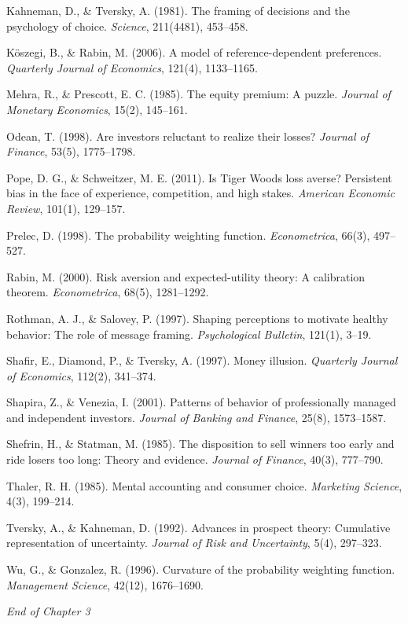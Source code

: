 \documentclass[12pt, letterpaper]{article}
\begin{document}
Kahneman, D., \& Tversky, A. (1981). The framing of decisions and the psychology of choice. \textit{Science}, 211(4481), 453--458.

Köszegi, B., \& Rabin, M. (2006). A model of reference-dependent preferences. \textit{Quarterly Journal of Economics}, 121(4), 1133--1165.

Mehra, R., \& Prescott, E. C. (1985). The equity premium: A puzzle. \textit{Journal of Monetary Economics}, 15(2), 145--161.

Odean, T. (1998). Are investors reluctant to realize their losses? \textit{Journal of Finance}, 53(5), 1775--1798.

Pope, D. G., \& Schweitzer, M. E. (2011). Is Tiger Woods loss averse? Persistent bias in the face of experience, competition, and high stakes. \textit{American Economic Review}, 101(1), 129--157.

Prelec, D. (1998). The probability weighting function. \textit{Econometrica}, 66(3), 497--527.

Rabin, M. (2000). Risk aversion and expected-utility theory: A calibration theorem. \textit{Econometrica}, 68(5), 1281--1292.

Rothman, A. J., \& Salovey, P. (1997). Shaping perceptions to motivate healthy behavior: The role of message framing. \textit{Psychological Bulletin}, 121(1), 3--19.

Shafir, E., Diamond, P., \& Tversky, A. (1997). Money illusion. \textit{Quarterly Journal of Economics}, 112(2), 341--374.

Shapira, Z., \& Venezia, I. (2001). Patterns of behavior of professionally managed and independent investors. \textit{Journal of Banking and Finance}, 25(8), 1573--1587.

Shefrin, H., \& Statman, M. (1985). The disposition to sell winners too early and ride losers too long: Theory and evidence. \textit{Journal of Finance}, 40(3), 777--790.

Thaler, R. H. (1985). Mental accounting and consumer choice. \textit{Marketing Science}, 4(3), 199--214.

Tversky, A., \& Kahneman, D. (1992). Advances in prospect theory: Cumulative representation of uncertainty. \textit{Journal of Risk and Uncertainty}, 5(4), 297--323.

Wu, G., \& Gonzalez, R. (1996). Curvature of the probability weighting function. \textit{Management Science}, 42(12), 1676--1690.

\medskip

\textit{End of Chapter 3}
\end{document}
